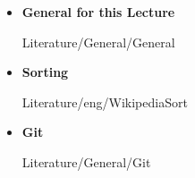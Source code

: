 \begin{frame}{\LectureFurtherLiterature}
  \begin{itemize}
    \item
    \textbf{General for this Lecture}
    \begin{btSect}{Literature/General/General}
      \btPrintAll
    \end{btSect}
  \end{itemize}
\end{frame}


\begin{frame}{\LectureFurtherLiterature}
  \begin{itemize}
    \item
      \textbf{Sorting}
      \begin{btSect}{Literature/eng/WikipediaSort}
        \btPrintAll
      \end{btSect}
  \end{itemize}
\end{frame}


\begin{frame}{\LectureFurtherLiterature}
  \begin{itemize}
    \item
      \textbf{Git}
      \begin{btSect}{Literature/General/Git}
        \btPrintAll
      \end{btSect}
  \end{itemize}
\end{frame}